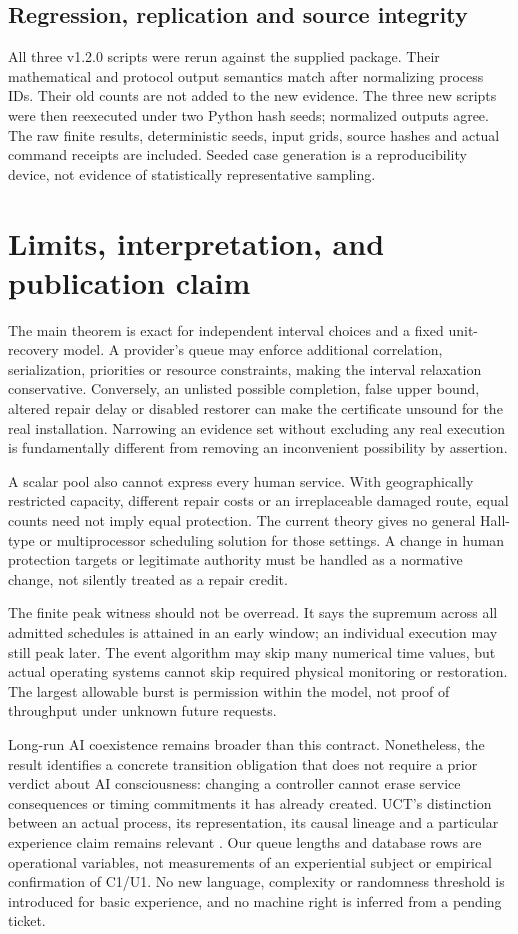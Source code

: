 \subsection{Regression, replication and source integrity}
All three v1.2.0 scripts were rerun against the supplied package. Their mathematical and protocol output semantics match after normalizing process IDs. Their old counts are not added to the new evidence. The three new scripts were then reexecuted under two Python hash seeds; normalized outputs agree. The raw finite results, deterministic seeds, input grids, source hashes and actual command receipts are included. Seeded case generation is a reproducibility device, not evidence of statistically representative sampling.

\section{Limits, interpretation, and publication claim}
\label{sec:limits}
The main theorem is exact for independent interval choices and a fixed unit-recovery model. A provider's queue may enforce additional correlation, serialization, priorities or resource constraints, making the interval relaxation conservative. Conversely, an unlisted possible completion, false upper bound, altered repair delay or disabled restorer can make the certificate unsound for the real installation. Narrowing an evidence set without excluding any real execution is fundamentally different from removing an inconvenient possibility by assertion.

A scalar pool also cannot express every human service. With geographically restricted capacity, different repair costs or an irreplaceable damaged route, equal counts need not imply equal protection. The current theory gives no general Hall-type or multiprocessor scheduling solution for those settings. A change in human protection targets or legitimate authority must be handled as a normative change, not silently treated as a repair credit.

The finite peak witness should not be overread. It says the supremum across all admitted schedules is attained in an early window; an individual execution may still peak later. The event algorithm may skip many numerical time values, but actual operating systems cannot skip required physical monitoring or restoration. The largest allowable burst is permission within the model, not proof of throughput under unknown future requests.

Long-run AI coexistence remains broader than this contract. Nonetheless, the result identifies a concrete transition obligation that does not require a prior verdict about AI consciousness: changing a controller cannot erase service consequences or timing commitments it has already created. UCT's distinction between an actual process, its representation, its causal lineage and a particular experience claim remains relevant \cite{uct}. Our queue lengths and database rows are operational variables, not measurements of an experiential subject or empirical confirmation of C1/U1. No new language, complexity or randomness threshold is introduced for basic experience, and no machine right is inferred from a pending ticket.

